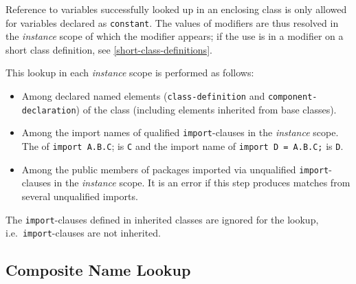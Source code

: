 Reference to variables successfully looked up in an enclosing class is only allowed for variables declared as \lstinline!constant!.
The values of modifiers are thus resolved in the \emph{instance} scope of which the modifier appears; if the use is in a modifier on a short class definition, see \cref{short-class-definitions}.

This lookup in each \emph{instance} scope is performed as follows:
\begin{itemize}
\item
  Among declared named elements (\lstinline!class-definition! and \lstinline!component-declaration!) of the class (including elements inherited from base classes).
\item
  Among the import names of qualified \lstinline!import!-clauses in the \emph{instance} scope.
  The  of \lstinline!import A.B.C!; is \lstinline!C! and the import name of \lstinline!import D = A.B.C;! is \lstinline!D!.
\item
  Among the public members of packages imported via unqualified \lstinline!import!-clauses in the \emph{instance} scope.
  It is an error if this step produces matches from several unqualified imports.
\end{itemize}

The \lstinline!import!-clauses defined in inherited classes are ignored for the lookup, i.e.\ \lstinline!import!-clauses are not inherited.


\subsection{Composite Name Lookup}\label{composite-name-lookup}

